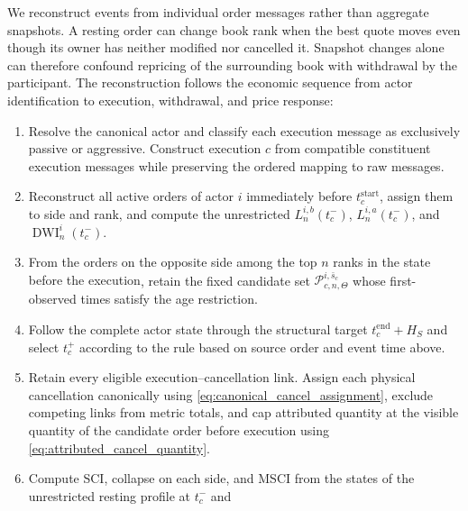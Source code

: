 \documentclass[11pt]{article}
\newenvironment{review}{\begingroup\color{blue}}{\endgroup}
\begin{document}
We reconstruct events \begin{review}from individual order messages rather than aggregate snapshots\end{review}. A resting order can change book rank
when the best quote moves even though its owner has neither modified nor cancelled it. Snapshot changes alone can therefore
confound repricing of the surrounding book with withdrawal by the participant. The reconstruction follows the economic
sequence from actor identification to execution, withdrawal, and price response:
\begin{enumerate}
    \item Resolve the canonical actor and classify each execution message as exclusively passive or aggressive. Construct execution $c$
    from compatible constituent execution messages while preserving the ordered mapping to raw messages.
    \item Reconstruct all active orders of actor $i$ immediately before $t_c^{\mathrm{start}}$, assign them to side and
    rank, and compute the unrestricted $L^{i,b}_{n}(t_c^{-})$, $L^{i,a}_{n}(t_c^{-})$, and
    $\operatorname{DWI}^{i}_{n}(t_c^{-})$.
    \item \begin{review}From the orders on the opposite side among the top $n$ ranks in the state before the execution\end{review}, retain the fixed candidate set
    $\mathcal{P}^{i,\bar{s}_c}_{c,n,\Theta}$ whose first-observed times satisfy the age restriction.
    \item Follow the complete actor state through the structural target $t_c^{\mathrm{end}}+H_S$ and select $t_c^{+}$
    according to \begin{review}the rule based on source order and event time\end{review} above.
    \item Retain every eligible execution--cancellation link. Assign each physical cancellation canonically using
    \cref{eq:canonical_cancel_assignment}, exclude competing links from metric totals, and cap attributed quantity at \begin{review}the visible quantity of the candidate order before execution\end{review} using \cref{eq:attributed_cancel_quantity}.
    \item Compute SCI, \begin{review}collapse on each side\end{review}, and MSCI from \begin{review}the states of the unrestricted resting profile\end{review} at $t_c^{-}$ and

\end{enumerate}
\end{document}

